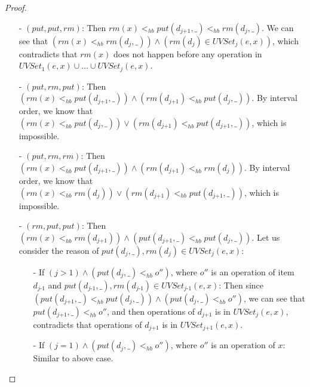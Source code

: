 \begin {proof}
\begin{itemize}
\item[-] $(\textit{put},\textit{put},\textit{rm})$: Then $\textit{rm}(x) <_{hb} \textit{put}(d_{\textit{j+1}},\_) <_{hb} \textit{rm}(d_j,\_)$. We can see that $( \textit{rm}(x) <_{hb} \textit{rm}(d_j,\_) ) \wedge ( \textit{rm}(d_j) \in \textit{UVSet}_j(e,x) )$, which contradicts that $\textit{rm}(x)$ does not happen before any operation in $\textit{UVSet}_1(e,x) \cup \ldots \cup \textit{UVSet}_j(e,x)$.

\item[-] $(\textit{put},\textit{rm},\textit{put})$: Then $( \textit{rm}(x) <_{hb} \textit{put}(d_{\textit{j+1}},\_) ) \wedge ( \textit{rm}(d_{\textit{j+1}}) <_{hb} \textit{put}(d_j,\_) )$. By interval order, we know that $( \textit{rm}(x) <_{hb} \textit{put}(d_j,\_) ) \vee ( \textit{rm}(d_{\textit{j+1}}) <_{hb} \textit{put}(d_{\textit{j+1}},\_) )$, which is impossible.

\item[-] $(\textit{put},\textit{rm},\textit{rm})$: Then $( \textit{rm}(x) <_{hb} \textit{put}(d_{\textit{j+1}},\_) ) \wedge ( \textit{rm}(d_{\textit{j+1}}) <_{hb} \textit{rm}(d_j) )$. By interval order, we know that $( \textit{rm}(x) <_{hb} \textit{rm}(d_j) ) \vee ( \textit{rm}(d_{\textit{j+1}}) <_{hb} \textit{put}(d_{\textit{j+1}},\_) )$, which is impossible.

\item[-] $(\textit{rm},\textit{put},\textit{put})$: Then $( \textit{rm}(x) <_{hb} \textit{rm}(d_{\textit{j+1}}) ) \wedge ( \textit{put}(d_{\textit{j+1}},\_) <_{hb} \textit{put}(d_j,\_) )$. Let us consider the reason of $\textit{put}(d_j,\_), \textit{rm}(d_j) \in \textit{UVSet}_j(e,x)$:
    \begin{itemize}
    \setlength{\itemsep}{0.5pt}
    \item[-] If $( j > 1 ) \wedge ( \textit{put}(d_j,\_) <_{hb} o'' )$, where $o''$ is an operation of item $d_{\textit{j-1}}$ and $\textit{put}(d_{\textit{j-1}},\_), \textit{rm}(d_{\textit{j-1}}) \in \textit{UVSet}_{\textit{j-1}}(e,x)$: Then since $( \textit{put}(d_{\textit{j+1}},\_) <_{hb} \textit{put}(d_j,\_) ) \wedge ( \textit{put}(d_j,\_) <_{hb} o'' )$, we can see that $\textit{put}(d_{\textit{j+1}},\_) <_{hb} o''$, and then operations of $d_{\textit{j+1}}$ is in $\textit{UVSet}_j(e,x)$, contradicts that operations of $d_{\textit{j+1}}$ is in $\textit{UVSet}_{\textit{j+1}}(e,x)$.

    \item[-] If $( j = 1 ) \wedge ( \textit{put}(d_j,\_) <_{hb} o'' )$, where $o''$ is an operation of $x$: Similar to above case.


\end{itemize}
\end{itemize}
\end{proof}
